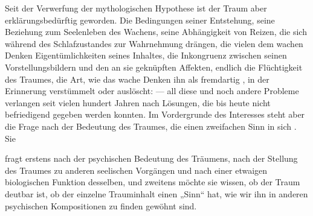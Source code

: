 \documentclass[twoside=true,titlepage=false,open=any, parskip=never, fontsize=10pt, headings=small, chapterprefix=false, appendixprefix=false]{scrbook}
\begin{document}
            
        \pstart
        Seit der Verwerfung der mythologischen Hypothese ist der
               Traum aber erklärungsbedürftig geworden. Die Bedingungen
               seiner Entstehung, seine Beziehung zum Seelenleben des Wachens, seine Abhängigkeit von Reizen, die sich während des Schlafzustandes zur Wahrnehmung drängen, die vielen dem wachen Denken  Eigentümlichkeiten seines Inhaltes, die Inkongruenz zwischen seinen
               Vorstellungsbildern und den an sie geknüpften
               Affekten, endlich die Flüchtigkeit des Traumes, die Art,
               wie das wache Denken ihn als fremdartig 
               , in der Erinnerung verstümmelt oder auslöscht:
               — all diese und noch andere Probleme verlangen seit vielen hundert
               Jahren nach Lösungen, die bis heute nicht befriedigend gegeben werden konnten.
               Im Vordergrunde des Interesses steht aber die Frage nach der Bedeutung des Traumes, die einen zweifachen Sinn
               in sich . Sie
        \pend
    
         
            
            
            
        \pstart
        fragt erstens nach der psychischen Bedeutung des Träumens, nach der
               Stellung des Traumes zu anderen seelischen Vorgängen
               und nach einer etwaigen biologischen Funktion desselben, und zweitens
               möchte sie wissen, ob der Traum deutbar ist, ob der einzelne
               Trauminhalt einen „Sinn“
               hat, wie wir ihn in anderen psychischen Kompositionen zu finden gewöhnt
               sind.
        \pend
    
\end{document}
